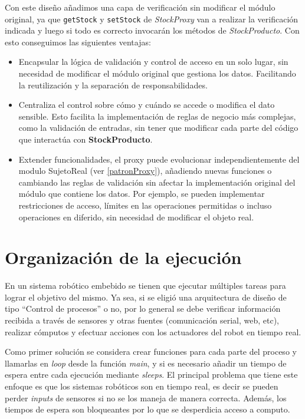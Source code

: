 Con este diseño añadimos una capa de verificación sin modificar el módulo original, ya que \verb|getStock| y \verb|setStock| de \textit{StockProxy} van a realizar la verificación indicada y luego si todo es correcto invocarán los métodos de \textit{StockProducto}. Con esto conseguimos las siguientes ventajas:

\begin{itemize}
    \item Encapsular la lógica de validación y control de acceso en un solo lugar, sin necesidad de modificar el módulo original que gestiona los datos. Facilitando la reutilización y la separación de responsabilidades.

    \item Centraliza el control sobre cómo y cuándo se accede o modifica el dato sensible. Esto facilita la implementación de reglas de negocio más complejas, como la validación de entradas, sin tener que modificar cada parte del código que interactúa con \textbf{StockProducto}.

    \item Extender funcionalidades, el proxy puede evolucionar independientemente del modulo SujetoReal (ver \ref{patronProxy}), añadiendo nuevas funciones o cambiando las reglas de validación sin afectar la implementación original del módulo que contiene los datos. Por ejemplo, se pueden implementar restricciones de acceso, límites en las operaciones permitidas o incluso operaciones en diferido, sin necesidad de modificar el objeto real.
\end{itemize}

\section{Organización de la ejecución}
\label{orgEjecucion}

En un sistema robótico embebido se tienen que ejecutar múltiples tareas para lograr el objetivo del mismo. Ya sea, si se eligió una arquitectura de diseño de tipo ``Control de procesos'' o no, por lo general se debe verificar información recibida a través de sensores y otras fuentes (comunicación serial, web, etc), realizar cómputos y efectuar acciones con los actuadores del robot en tiempo real.

Como primer solución se considera crear funciones para cada parte del proceso y llamarlas en \textit{loop} desde la función \textit{main}, y si es necesario añadir un tiempo de espera entre cada ejecución mediante \textit{sleeps}. El principal problema que tiene este enfoque es que los sistemas robóticos son en tiempo real, es decir se pueden perder \textit{inputs} de sensores si no se los maneja de manera correcta. Además, los tiempos de espera son bloqueantes por lo que se desperdicia acceso a computo. 

